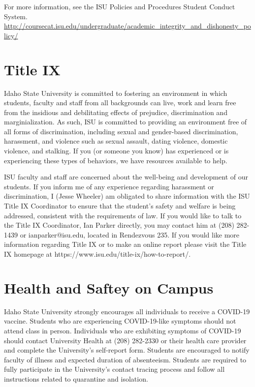\documentclass[11pt]{article}\usepackage[]{graphicx}\usepackage[]{xcolor}
\begin{document}
For more information, see the ISU Policies and Procedures Student Conduct System.
\url{http://coursecat.isu.edu/undergraduate/academic\_integrity\_and\_dishonesty\_policy/}

\section{Title IX}

Idaho State University is committed to fostering an environment in which students, faculty and staff from all backgrounds can live, work and learn free from the insidious and debilitating effects of prejudice, discrimination and marginialization.
As such, ISU is committed to providing an environment free of all forms of discrimination, including sexual and gender-based discrimination, harassment, and violence such as sexual assault, dating violence, domestic violence, and stalking.
If you (or someone you know) has experienced or is experiencing these types of behaviors, we have resources available to help.  

ISU faculty and staff are concerned about the well-being and development of our students. 
If you inform me of any experience regarding harassment or discrimination, I (Jesse Wheeler) am obligated to share information with the ISU Title IX Coordinator to ensure that the student’s safety and welfare is being addressed, consistent with the requirements of law.
If you would like to talk to the Title IX Coordinator, Ian Parker directly, you may contact him at (208) 282-1439 or ianparker@isu.edu, located in Rendezvous 235.
If you would like more information regarding Title IX or to make an online report please visit the Title IX homepage at https://www.isu.edu/title-ix/how-to-report/.

\section{Health and Saftey on Campus}

Idaho State University strongly encourages all individuals to receive a COVID-19 vaccine.
Students who are experiencing COVID-19-like symptoms should not attend class in person.
Individuals who are exhibiting symptoms of COVID-19 should contact University Health at (208) 282-2330 or their health care provider and complete the University’s self-report form.
Students are encouraged to notify faculty of illness and expected duration of absenteeism.
Students are required to fully participate in the University’s contact tracing process and follow all instructions related to quarantine and isolation.
\end{document}
